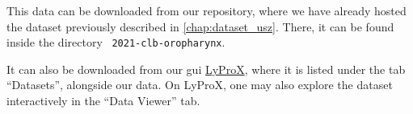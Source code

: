 \begin{tcolorbox}[title=\faIcon{database} Data, parbox=false]
    This data can be downloaded from our  repository, where we have already hosted the dataset previously described in \cref{chap:dataset_usz}. There, it can be found inside the directory ~\texttt{2021-clb-oropharynx}.

    It can also be downloaded from our \gls{gui} \href{https://lyprox.org}{ LyProX}, where it is listed under the tab ``Datasets'', alongside our data. On LyProX, one may also explore the dataset interactively in the ``Data Viewer'' tab.
\end{tcolorbox}
